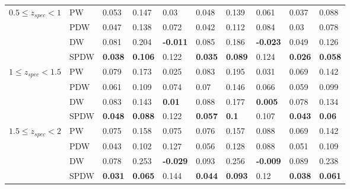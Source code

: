 \documentclass[fleqn,usenatbib]{mnras}
\begin{document}
\begin{table}
\begin{tabular}{llllllllll}
\hline
            $0.5 \leq z_{spec} < 1$ & PW &                0.053 &           0.147 &             0.03 &            0.048 &           0.139 &            0.061 &            0.037 &           0.088 \\
                              & PDW &                0.047 &           0.138 &            0.072 &            0.042 &           0.112 &            0.084 &             0.03 &           0.078 \\
                              & DW &                0.081 &           0.204 &  \textbf{-0.011} &            0.085 &           0.186 &  \textbf{-0.023} &            0.049 &           0.126 \\
                              & SPDW &       \textbf{0.038} &  \textbf{0.106} &            0.122 &   \textbf{0.035} &  \textbf{0.089} &            0.124 &   \textbf{0.026} &  \textbf{0.058} \\
\hline
            $1 \leq z_{spec} < 1.5$ & PW &                0.079 &           0.173 &            0.025 &            0.083 &           0.195 &            0.031 &            0.069 &           0.142 \\
                              & PDW &                0.061 &           0.109 &            0.074 &             0.07 &           0.146 &            0.066 &            0.059 &           0.099 \\
                              & DW &                0.083 &           0.143 &    \textbf{0.01} &            0.088 &           0.177 &   \textbf{0.005} &            0.078 &           0.134 \\
                              & SPDW &       \textbf{0.048} &  \textbf{0.088} &            0.122 &   \textbf{0.057} &    \textbf{0.1} &            0.107 &   \textbf{0.043} &   \textbf{0.06} \\
\hline
            $1.5 \leq z_{spec} < 2$ & PW &                0.075 &           0.158 &            0.075 &            0.076 &           0.157 &            0.088 &            0.069 &           0.142 \\
                              & PDW &                0.043 &           0.102 &            0.127 &            0.056 &           0.128 &            0.088 &            0.051 &           0.109 \\
                              & DW &                0.078 &           0.253 &  \textbf{-0.029} &            0.093 &           0.256 &  \textbf{-0.009} &            0.089 &           0.238 \\
                              & SPDW &       \textbf{0.031} &  \textbf{0.065} &            0.144 &   \textbf{0.044} &  \textbf{0.093} &             0.12 &   \textbf{0.038} &  \textbf{0.061} \\

\end{tabular}
\end{table}
\end{document}
